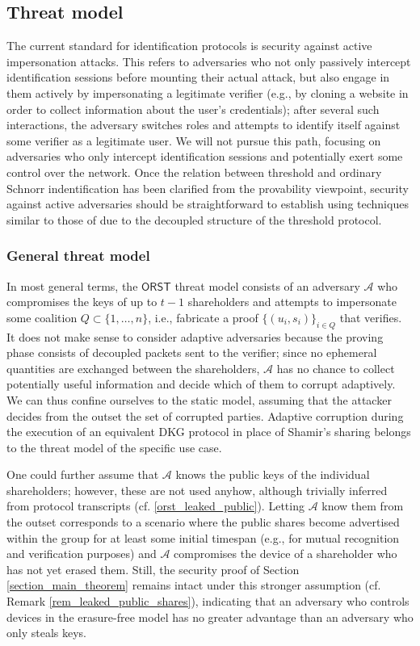 \documentclass{iacrtrans}
\begin{document}
\subsection{Threat model}\label{section_threat_model}

The current standard for identification protocols is
security against active impersonation attacks. This refers to
adversaries who not only passively intercept identification
sessions before mounting their actual attack,
but also engage in them actively by impersonating
a legitimate verifier (e.g., by cloning a website in order
to collect information about the user's credentials);
after several such interactions, the adversary switches roles
and attempts to identify itself against some verifier as a
legitimate user.
We will not pursue this path, focusing
on adversaries who only intercept
identification sessions and potentially exert
some control over the network.
Once the relation between threshold and ordinary
Schnorr indentification has been clarified
from the provability viewpoint,
security against active adversaries should be straightforward
to establish using techniques similar to those
of \cite{paper_bellare_palacio}
due to the decoupled structure of the threshold protocol.

\subsubsection{General threat model}\label{section_general_threat_model}

In most general terms, the $\textsf{ORST}$ threat model
consists of an
adversary $\mathcal{A}$ who compromises the keys
of up to $t-1$ shareholders
and attempts to impersonate some coalition
$Q \subset \{1, \dots, n\}$,
i.e., fabricate a proof
$\{(u_i, s_i)\}_{i \in Q}$ that verifies.
It does not make sense to consider adaptive adversaries
because the proving phase consists of decoupled
packets sent to the verifier;
since no ephemeral quantities are exchanged between the shareholders,
$\mathcal{A}$ has no chance to collect potentially
useful information and decide which of them
to corrupt adaptively.
We can thus confine ourselves to the static model,
assuming that the attacker decides from the outset the
set of corrupted parties.
Adaptive corruption during the execution
of an equivalent DKG protocol in place of Shamir's sharing
belongs to the threat model
of the specific use case.

One could further
assume that $\mathcal{A}$ knows
the public keys of the individual shareholders;
however, these are not used anyhow,
although trivially inferred from protocol transcripts
(cf. \eqref{orst_leaked_public}).
Letting $\mathcal{A}$ know them from the outset
corresponds to a scenario where the public shares
become advertised within the group
for at least some initial timespan
(e.g., for mutual recognition and verification purposes)
and $\mathcal{A}$ compromises the device
of a shareholder who has not yet erased them.
Still, the security proof of
Section \ref{section_main_theorem}
remains intact under this stronger assumption
(cf. Remark \ref{rem_leaked_public_shares}), indicating that
an adversary who controls devices
in the erasure-free model has no greater advantage than an
adversary who only steals keys.
\end{document}
